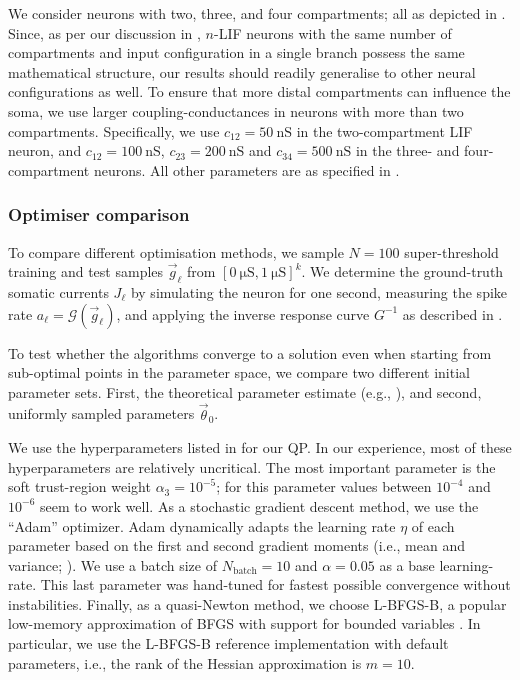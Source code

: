 We consider \nlif neurons with two, three, and four compartments; all as depicted in .
Since, as per our discussion in , $n$-LIF neurons with the same number of compartments and input configuration in a single branch possess the same mathematical structure, our results should readily generalise to other neural configurations as well.
To ensure that more distal compartments can influence the soma, we use larger coupling-conductances in neurons with more than two compartments.
Specifically, we use $c_{12} = \SI{50}{\nano\siemens}$ in the two-compartment LIF neuron, and $c_{12} = \SI{100}{\nano\siemens}$, $c_{23} = \SI{200}{\nano\siemens}$ and $c_{34} = \SI{500}{\nano\siemens}$ in the three- and four-compartment neurons.
All other parameters are as specified in .

\subsubsection{Optimiser comparison}
To compare different optimisation methods, we sample $N = 100$ super-threshold training and test samples $\vec g_\ell$ from $[\SI{0}{\micro\siemens}, \SI{1}{\micro\siemens}]^k$.
We determine the ground-truth somatic currents $J_\ell$ by simulating the neuron for one second, measuring the spike rate $a_\ell = \mathscr{G}(\vec g_\ell)$, and applying the inverse response curve $G^{-1}$ as described in .

To test whether the algorithms converge to a solution even when starting from sub-optimal points in the parameter space, we compare two different initial parameter sets.
First, the theoretical parameter estimate (e.g., ), and second, uniformly sampled parameters $\vec \theta_0$.

We use the hyperparameters listed in  for our QP.
In our experience, most of these hyperparameters are relatively uncritical.
The most important parameter is the soft trust-region weight $\alpha_3 = 10^{-5}$; for this parameter values between $10^{-4}$ and $10^{-6}$ seem to work well.
As a stochastic gradient descent method, we use the \enquote{Adam} optimizer.
Adam dynamically adapts the learning rate $\eta$ of each parameter based on the first and second gradient moments (i.e., mean and variance; \cite{kingma2015adam}).
We use a batch size of $N_\mathrm{batch} = 10$ and $\alpha = 0.05$ as a base learning-rate.
This last parameter was hand-tuned for fastest possible convergence without instabilities.
Finally, as a quasi-Newton method, we choose L-BFGS-B, a popular low-memory approximation of BFGS with support for bounded variables \citep{byrd1995limited}.
In particular, we use the L-BFGS-B reference implementation with default parameters, i.e., the rank of the Hessian approximation is $m = 10$.

